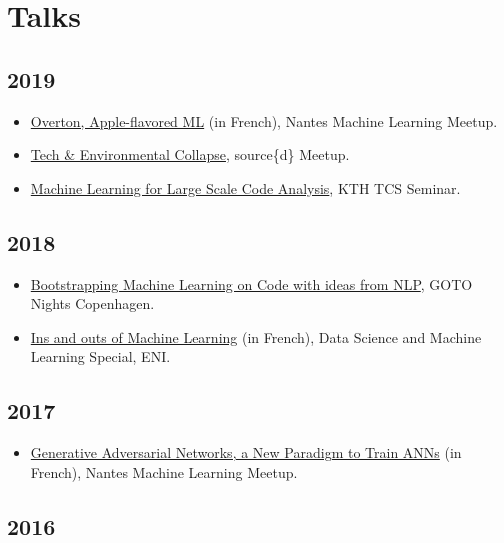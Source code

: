 \documentclass[11pt,a4paper,sans]{moderncv}        %
\begin{document}
\section{Talks}

\subsection{2019}

\begin{itemize}
\item
  \href{https://www.meetup.com/Nantes-Machine-Learning-Meetup/events/265265431/}{Overton,
    Apple-flavored ML} (in French), Nantes Machine Learning Meetup.
\item
  \href{https://www.eventbrite.com/e/tech-environmental-collapse-tickets-57986002695}{Tech
    \& Environmental Collapse}, source\{d\} Meetup.
\item \href{https://github.com/m09/talks/tree/master/kth}{Machine
    Learning for Large Scale Code Analysis}, KTH TCS Seminar.
\end{itemize}

\subsection{2018}

\begin{itemize}
\item
  \href{https://www.meetup.com/GOTO-Nights-CPH/events/256342503/}{Bootstrapping
    Machine Learning on Code with ideas from NLP}, GOTO Nights
  Copenhagen.
\item
  \href{https://www.mapado.com/nantes/la-matinale-de-la-data-science-et-du-machine-learning}{Ins
    and outs of Machine Learning} (in French), Data Science and
  Machine Learning Special, ENI.
\end{itemize}
\subsection{2017}

\begin{itemize}
\item
  \href{https://www.meetup.com/Nantes-Machine-Learning-Meetup/events/239481485/}{Generative
    Adversarial Networks, a New Paradigm to Train ANNs} (in French),
  Nantes Machine Learning Meetup.
\end{itemize}

\subsection{2016}
\end{document}
